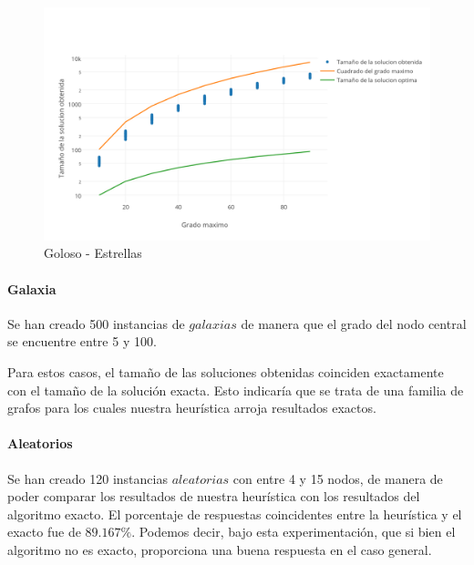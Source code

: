 \begin{figure}[htb]
	\begin{center}
    		\includegraphics[scale=0.8]{imagenes/goloso-estrella.png}
	\end{center}
	\caption{Goloso - Estrellas \label{fig:2C}}
\end{figure}

\paragraph{Galaxia} Se han creado 500 instancias de $galaxias$ de manera que el grado del nodo central se encuentre entre 5 y 100.

Para estos casos, el tamaño de las soluciones obtenidas coinciden exactamente con el tamaño de la solución exacta. Esto indicaría que se trata de una familia de grafos para los cuales nuestra heurística arroja resultados exactos.

\paragraph{Aleatorios} Se han creado 120 instancias $aleatorias$ con entre 4 y 15 nodos, de manera de poder comparar los resultados de nuestra heurística con los resultados del algoritmo exacto. El porcentaje de respuestas coincidentes entre la heurística y el exacto fue de $89.167\%$. Podemos decir, bajo esta experimentación, que si bien el algoritmo no es exacto, proporciona una buena respuesta en el caso general.

\vspace*{0.6cm}